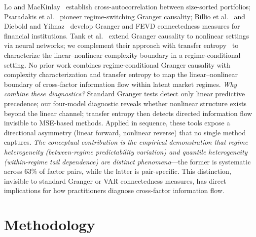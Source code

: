 \documentclass[sigconf,anonymous]{acmart}
\begin{document}
Lo and MacKinlay~\cite{lo1990contrarian} establish cross-autocorrelation between
size-sorted portfolios; Psaradakis et al.~\cite{psaradakis2005markov} pioneer
regime-switching Granger causality; Billio et al.~\cite{billio2012econometric}
and Diebold and Yilmaz~\cite{diebold2012better} develop Granger and FEVD
connectedness measures for financial institutions.
Tank et al.~\cite{tank2022neural} extend Granger causality to nonlinear settings
via neural networks; we complement their approach with transfer
entropy~\cite{schreiber2000measuring,barnett2009granger} to characterize
the linear--nonlinear complexity boundary in a regime-conditional setting.
No prior work combines regime-conditional Granger causality with
complexity characterization and transfer entropy
to map the linear--nonlinear boundary of cross-factor information flow
within latent market regimes.
\emph{Why combine these diagnostics?}
Standard Granger tests detect only linear predictive precedence; our
four-model diagnostic reveals whether nonlinear structure exists
beyond the linear channel; transfer entropy then detects directed
information flow invisible to MSE-based methods.
Applied in sequence, these tools expose a directional
asymmetry (linear forward, nonlinear reverse) that no single
method captures. \emph{The conceptual contribution is the
empirical demonstration that regime heterogeneity (between-regime
predictability variation) and quantile heterogeneity (within-regime
tail dependence) are distinct phenomena}---the former is systematic
across 63\% of factor pairs, while the latter is pair-specific.
This distinction, invisible to standard Granger or VAR connectedness
measures, has direct implications for how practitioners diagnose
cross-factor information flow.

\section{Methodology}
\end{document}
